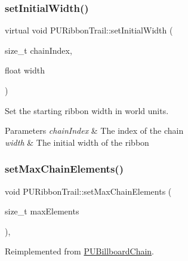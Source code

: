 \subsubsection{\texorpdfstring{set\+Initial\+Width()}{setInitialWidth()}\hspace{0.1cm}{\footnotesize\ttfamily [2/2]}}
{\footnotesize\ttfamily virtual void P\+U\+Ribbon\+Trail\+::set\+Initial\+Width (\begin{DoxyParamCaption}\item[{size\+\_\+t}]{chain\+Index,  }\item[{float}]{width }\end{DoxyParamCaption})\hspace{0.3cm}{\ttfamily [virtual]}}

Set the starting ribbon width in world units. 
\begin{DoxyParams}{Parameters}
{\em chain\+Index} & The index of the chain \\
\hline
{\em width} & The initial width of the ribbon \\
\hline
\end{DoxyParams}
\mbox{\label{classPURibbonTrail_af755423a7832221d273b9e2daae26dbe}} 
\subsubsection{\texorpdfstring{set\+Max\+Chain\+Elements()}{setMaxChainElements()}\hspace{0.1cm}{\footnotesize\ttfamily [1/2]}}
{\footnotesize\ttfamily void P\+U\+Ribbon\+Trail\+::set\+Max\+Chain\+Elements (\begin{DoxyParamCaption}\item[{size\+\_\+t}]{max\+Elements }\end{DoxyParamCaption})\hspace{0.3cm}{\ttfamily [override]}, {\ttfamily [virtual]}}







Reimplemented from \hyperlink{classPUBillboardChain_aa58e00d60390334e66dd7742f708ee76}{P\+U\+Billboard\+Chain}.

\mbox{\label{classPURibbonTrail_af755423a7832221d273b9e2daae26dbe}} 
